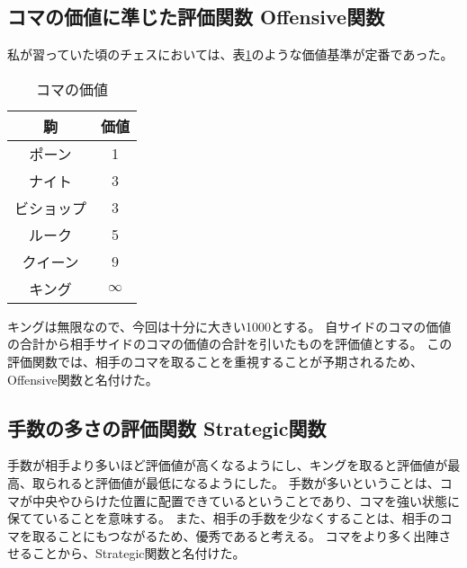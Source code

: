 \documentclass[12pt, a4paper, uplatex]{jsarticle}
\begin{document}
\subsection{コマの価値に準じた評価関数 Offensive関数}
私が習っていた頃のチェスにおいては、表\ref*{tab:piece_value}のような価値基準が定番であった。
\begin{table}
  \centering
  \caption{コマの価値}\label{tab:piece_value}
  \begin{tabular}{|c|c|}
    \hline
    駒     & 価値       \\
    \hline
    ポーン   & 1        \\
    ナイト   & 3        \\
    ビショップ & 3        \\
    ルーク   & 5        \\
    クイーン  & 9        \\
    キング   & $\infty$ \\
    \hline
  \end{tabular}
\end{table}
キングは無限なので、今回は十分に大きい1000とする。
自サイドのコマの価値の合計から相手サイドのコマの価値の合計を引いたものを評価値とする。
この評価関数では、相手のコマを取ることを重視することが予期されるため、
Offensive関数と名付けた。

\subsection{手数の多さの評価関数 Strategic関数}
手数が相手より多いほど評価値が高くなるようにし、キングを取ると評価値が最高、取られると評価値が最低になるようにした。
手数が多いということは、コマが中央やひらけた位置に配置できているということであり、コマを強い状態に保てていることを意味する。
また、相手の手数を少なくすることは、相手のコマを取ることにもつながるため、優秀であると考える。
コマをより多く出陣させることから、Strategic関数と名付けた。
\end{document}
